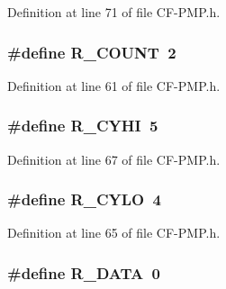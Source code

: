 Definition at line 71 of file C\+F-\/\+P\+M\+P.\+h.

\hypertarget{_c_f-_p_m_p_8h_a0cb64f6ffafe32f3ef2b7a7b1051b591}{}
\subsubsection[{R\+\_\+\+C\+O\+U\+N\+T}]{\setlength{\rightskip}{0pt plus 5cm}\#define R\+\_\+\+C\+O\+U\+N\+T~2}\label{_c_f-_p_m_p_8h_a0cb64f6ffafe32f3ef2b7a7b1051b591}


Definition at line 61 of file C\+F-\/\+P\+M\+P.\+h.

\hypertarget{_c_f-_p_m_p_8h_ab81360234f216f08abe4f84bc2cd15bd}{}
\subsubsection[{R\+\_\+\+C\+Y\+H\+I}]{\setlength{\rightskip}{0pt plus 5cm}\#define R\+\_\+\+C\+Y\+H\+I~5}\label{_c_f-_p_m_p_8h_ab81360234f216f08abe4f84bc2cd15bd}


Definition at line 67 of file C\+F-\/\+P\+M\+P.\+h.

\hypertarget{_c_f-_p_m_p_8h_a970d3f9d433a03b1978c39ff42b70fa2}{}
\subsubsection[{R\+\_\+\+C\+Y\+L\+O}]{\setlength{\rightskip}{0pt plus 5cm}\#define R\+\_\+\+C\+Y\+L\+O~4}\label{_c_f-_p_m_p_8h_a970d3f9d433a03b1978c39ff42b70fa2}


Definition at line 65 of file C\+F-\/\+P\+M\+P.\+h.

\hypertarget{_c_f-_p_m_p_8h_ac51dc180dde0fcda153d9e61f5c0f2f8}{}
\subsubsection[{R\+\_\+\+D\+A\+T\+A}]{\setlength{\rightskip}{0pt plus 5cm}\#define R\+\_\+\+D\+A\+T\+A~0}\label{_c_f-_p_m_p_8h_ac51dc180dde0fcda153d9e61f5c0f2f8}


